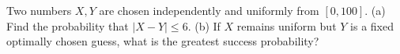 Two numbers $X,Y$ are chosen independently and uniformly from $[0,100]$. (a) Find the probability that $|X-Y|\le6$. (b) If $X$ remains uniform but $Y$ is a fixed optimally chosen guess, what is the greatest success probability?
